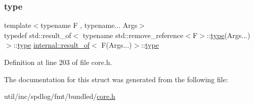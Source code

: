 \subsubsection{\texorpdfstring{type}{type}}
{\footnotesize\ttfamily template$<$typename F , typename... Args$>$ \\
typedef std\+::result\+\_\+of$<$ typename std\+::remove\+\_\+reference$<$F$>$\+::\hyperlink{structinternal_1_1result__of_3_01_f_07_args_8_8_8_08_4_a7357d60ac9880b6a8fd70bbed3cc18f5}{type}(Args...)$>$\+::\hyperlink{structinternal_1_1result__of_3_01_f_07_args_8_8_8_08_4_a7357d60ac9880b6a8fd70bbed3cc18f5}{type} \hyperlink{structinternal_1_1result__of}{internal\+::result\+\_\+of}$<$ F(Args...)$>$\+::\hyperlink{structinternal_1_1result__of_3_01_f_07_args_8_8_8_08_4_a7357d60ac9880b6a8fd70bbed3cc18f5}{type}}



Definition at line 203 of file core.\+h.



The documentation for this struct was generated from the following file\+:\begin{DoxyCompactItemize}
\item 
util/inc/spdlog/fmt/bundled/\hyperlink{core_8h}{core.\+h}\end{DoxyCompactItemize}

